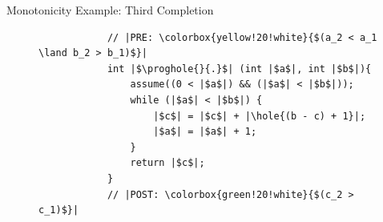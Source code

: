 \documentclass[9pt]{beamer}
\newcommand{\hole}[1]{\fbox{\ensuremath{#1}}}
\newcommand{\prog}{\ensuremath{\mathcal{P}}\xspace}
\newcommand{\proghole}[2]{\ensuremath{\prog_{#1}^{[#2]}}}
\begin{document}
\begin{frame}[fragile]{Monotonicity Example: Third Completion}
        \begin{figure}[t]
    \begin{minipage}{0.45\columnwidth}
        \begin{verbatim}
            // |PRE: \colorbox{yellow!20!white}{$(a_2 < a_1 \land b_2 > b_1)$}|
            int |$\proghole{}{.}$| (int |$a$|, int |$b$|){
                assume((0 < |$a$|) && (|$a$| < |$b$|));
                while (|$a$| < |$b$|) {
                    |$c$| = |$c$| + |\hole{(b - c) + 1}|;
                    |$a$| = |$a$| + 1;
                }
                return |$c$|;
            }
            // |POST: \colorbox{green!20!white}{$(c_2 > c_1)$}|
        \end{verbatim}
    \end{minipage}
    \begin{minipage}{0.45\columnwidth}
        \centering

\end{minipage}
\end{figure}
\end{frame}
\end{document}

